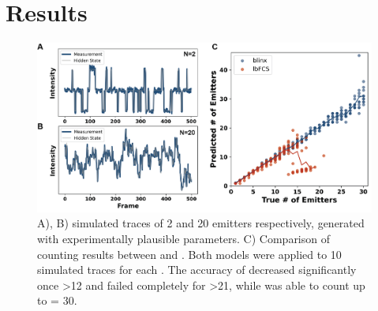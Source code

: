 \section{Results}

\begin{figure}[ht]
  \includegraphics[width=\linewidth]{figures/comparison_lbfcs}
  \caption{A), B) simulated traces of 2 and 20 emitters respectively, generated with experimentally plausible parameters. C) Comparison of counting results between \ours and \lbfcs. Both models were applied to 10 simulated traces for each \truen. The accuracy of \lbfcs decreased significantly once \truen \textgreater 12 and failed completely for \truen \textgreater 21, while \ours was able to count up to \truen = 30.  }
  \label{fig:results:comparison}
\end{figure}

